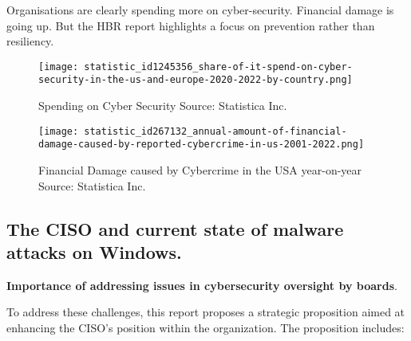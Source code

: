Organisations are clearly spending more on cyber-security.  Financial damage is going up. But the HBR report highlights a focus on prevention rather than resiliency.  
   
\begin{figure}[!ht] %
  \texttt{[image: statistic\_id1245356\_share-of-it-spend-on-cyber-security-in-the-us-and-europe-2020-2022-by-country.png]}\hfill
  \caption{Spending on Cyber Security  \autocite{Hiscox:2022}  Source: Statistica Inc.}
  \label{fig:cybersecurity-spending}
\end{figure}

\begin{figure}[!ht] %
  \texttt{[image: statistic\_id267132\_annual-amount-of-financial-damage-caused-by-reported-cybercrime-in-us-2001-2022.png]}\hfill
  \caption{Financial Damage caused by Cybercrime in the USA year-on-year \autocite{FBI:2023} Source: Statistica Inc.}
  \label{fig:cybercrime-cost}
\end{figure}


   
\subsection{The CISO and current state of malware attacks on Windows.}

\textbf{Importance of addressing issues in cybersecurity oversight by boards}.

To address these challenges, this report proposes a strategic proposition aimed at enhancing the CISO's position within the organization. The proposition includes:


